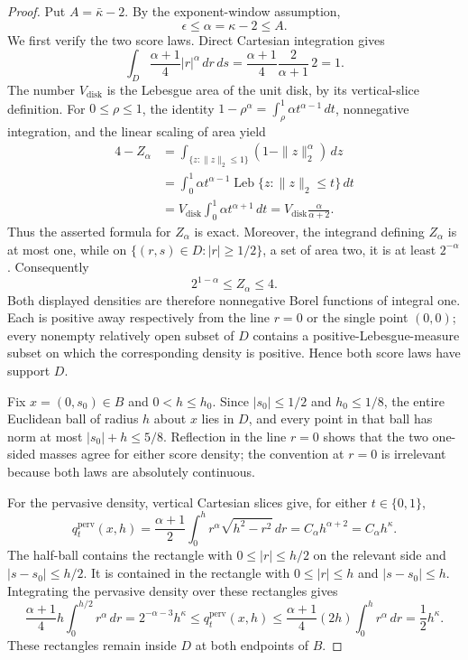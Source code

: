 \documentclass{article}
\begin{document}
\begin{proof}
Put \(A=\bar\kappa-2\).  By the exponent-window assumption,
\[
 \epsilon\leq \alpha=\kappa-2\leq A.
\]
We first verify the two score laws.  Direct Cartesian integration gives
\[
 \int_D \frac{\alpha+1}{4}|r|^\alpha\,dr\,ds
 =\frac{\alpha+1}{4}\frac{2}{\alpha+1}\,2=1.
\]
The number \(V_{\mathrm{disk}}\) is the Lebesgue area of the unit disk, by its
vertical-slice definition.  For \(0\leq \rho\leq1\), the identity
\(1-\rho^\alpha=\int_\rho^1\alpha t^{\alpha-1}\,dt\), nonnegative integration,
and the linear scaling of area yield
\[
\begin{aligned}
 4-Z_\alpha
 &=\int_{\{z:\|z\|_2\leq1\}}(1-\|z\|_2^\alpha)\,dz\\
 &=\int_0^1\alpha t^{\alpha-1}
       \operatorname{Leb}\{z:\|z\|_2\leq t\}\,dt\\
 &=V_{\mathrm{disk}}\int_0^1\alpha t^{\alpha+1}\,dt
 =V_{\mathrm{disk}}\frac{\alpha}{\alpha+2}.
\end{aligned}
\]
Thus the asserted formula for \(Z_\alpha\) is exact.  Moreover, the integrand
defining \(Z_\alpha\) is at most one, while on
\(\{(r,s)\in D:|r|\geq1/2\}\), a set of area two, it is at least
\(2^{-\alpha}\).  Consequently
\[
 2^{1-\alpha}\leq Z_\alpha\leq4.
 \tag{1}
\]
Both displayed densities are therefore nonnegative Borel functions of integral
one.  Each is positive away respectively from the line \(r=0\) or the single
point \((0,0)\); every nonempty relatively open subset of \(D\) contains a
positive-Lebesgue-measure subset on which the corresponding density is positive.
Hence both score laws have support \(D\).

Fix \(x=(0,s_0)\in B\) and \(0<h\leq h_0\).  Since
\(|s_0|\leq1/2\) and \(h_0\leq1/8\), the entire Euclidean ball of radius \(h\)
about \(x\) lies in \(D\), and every point in that ball has norm at most
\(|s_0|+h\leq5/8\).  Reflection in the line \(r=0\) shows that the two
one-sided masses agree for either score density; the convention at \(r=0\) is
irrelevant because both laws are absolutely continuous.

For the pervasive density, vertical Cartesian slices give, for either
\(t\in\{0,1\}\),
\[
 q_t^{\mathrm{perv}}(x,h)
 =\frac{\alpha+1}{2}\int_0^h r^\alpha\sqrt{h^2-r^2}\,dr
 =C_\alpha h^{\alpha+2}=C_\alpha h^\kappa.
 \tag{2}
\]
The half-ball contains the rectangle with
\(0\leq |r|\leq h/2\) on the relevant side and
\(|s-s_0|\leq h/2\).  It is contained in the rectangle with
\(0\leq |r|\leq h\) and \(|s-s_0|\leq h\).  Integrating the pervasive density
over these rectangles gives
\[
 \frac{\alpha+1}{4}h\int_0^{h/2}r^\alpha\,dr
 =2^{-\alpha-3}h^\kappa
 \leq q_t^{\mathrm{perv}}(x,h)
 \leq \frac{\alpha+1}{4}(2h)\int_0^h r^\alpha\,dr
 =\frac12h^\kappa.
 \tag{3}
\]
These rectangles remain inside \(D\) at both endpoints of \(B\).


\end{proof}
\end{document}
